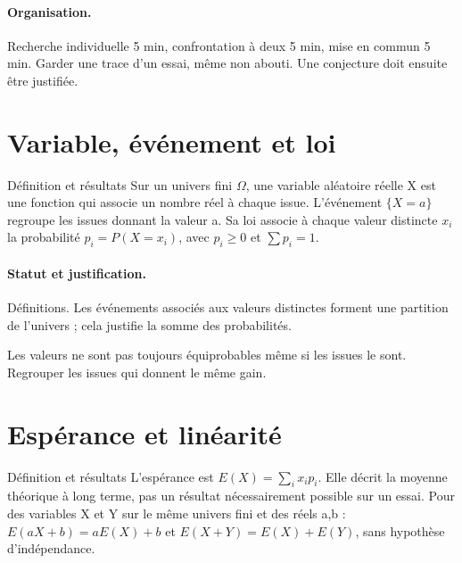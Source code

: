\paragraph{Organisation.} Recherche individuelle 5 min, confrontation à deux 5 min, mise en commun 5 min. Garder une trace d’un essai, même non abouti. Une conjecture doit ensuite être justifiée.
\section{Variable, événement et loi}\label{C08-U1}
\begin{repere}{Définition et résultats}
Sur un univers fini $\Omega$, une variable aléatoire réelle X est une fonction qui associe un nombre réel à chaque issue. L’événement $\{X=a\}$ regroupe les issues donnant la valeur a. Sa loi associe à chaque valeur distincte $x_i$ la probabilité $p_i=P(X=x_i)$, avec $p_i\geq0$ et $\sum p_i=1$.
\end{repere}
\paragraph{Statut et justification.} Définitions. Les événements associés aux valeurs distinctes forment une partition de l’univers ; cela justifie la somme des probabilités.
\label{C08-EX1}

\begin{erreur}Les valeurs ne sont pas toujours équiprobables même si les issues le sont. Regrouper les issues qui donnent le même gain.\end{erreur}
\label{C08-AP1}
\section{Espérance et linéarité}\label{C08-U2}
\begin{repere}{Définition et résultats}
L’espérance est $E(X)=\sum_i x_ip_i$. Elle décrit la moyenne théorique à long terme, pas un résultat nécessairement possible sur un essai. Pour des variables X et Y sur le même univers fini et des réels a,b : $E(aX+b)=aE(X)+b$ et $E(X+Y)=E(X)+E(Y)$, sans hypothèse d’indépendance.
\end{repere}
